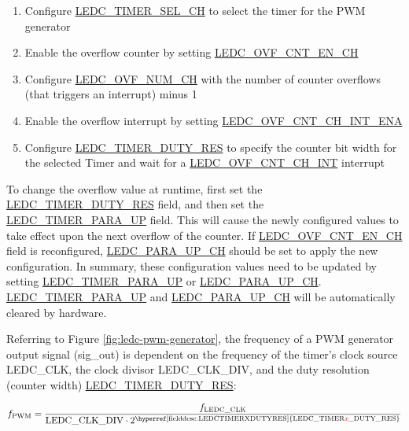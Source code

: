 \documentclass[main\_\_EN.tex]{subfiles}
\begin{document}
 \begin{enumerate}
    \item Configure \hyperref[fielddesc:LEDCTIMERSELCHN]{LEDC\_TIMER\_SEL\_CH} to select the timer for the PWM generator
    \item Enable the overflow counter by setting  \hyperref[fielddesc:LEDCOVFCNTENCHN]{LEDC\_OVF\_CNT\_EN\_CH}
    \item Configure \hyperref[fielddesc:LEDCOVFNUMCHN]{LEDC\_OVF\_NUM\_CH} with the number of counter overflows (that triggers an interrupt) minus 1
    \item Enable the overflow interrupt by setting \hyperref[fielddesc:LEDCOVFCNTCHNINTENA]{LEDC\_OVF\_CNT\_CH\_INT\_ENA}
    \item Configure \hyperref[fielddesc:LEDCTIMERXDUTYRES]{LEDC\_TIMER\_DUTY\_RES} to specify the counter bit width for the selected Timer and wait for a \hyperref[int:ledc-ovf-cnt]{LEDC\_OVF\_CNT\_CH\_INT} interrupt
\end{enumerate}

To change the overflow value at runtime, first set the \hyperref[fielddesc:LEDCTIMERXDUTYRES]{LEDC\_TIMER\_DUTY\_RES} field, and then set the\\ \hyperref[fielddesc:LEDCTIMERXPARAUP]{LEDC\_TIMER\_PARA\_UP} field. This will cause the newly configured values to take effect upon the next overflow of the counter. If \hyperref[fielddesc:LEDCOVFCNTENCHN]{LEDC\_OVF\_CNT\_EN\_CH} field is reconfigured, \hyperref[fielddesc:LEDCPARAUPCHN]{LEDC\_PARA\_UP\_CH} should be set to apply the new configuration. In summary, these configuration values need to be updated by setting \hyperref[fielddesc:LEDCTIMERXPARAUP]{LEDC\_TIMER\_PARA\_UP} or \hyperref[fielddesc:LEDCPARAUPCHN]{LEDC\_PARA\_UP\_CH}. \hyperref[fielddesc:LEDCTIMERXPARAUP]{LEDC\_TIMER\_PARA\_UP} and \hyperref[fielddesc:LEDCPARAUPCHN]{LEDC\_PARA\_UP\_CH} will be automatically cleared by hardware.

Referring to Figure \ref{fig:ledc-pwm-generator}, the frequency of a PWM generator output signal (sig\_out) is dependent on the frequency of the timer's clock source LEDC\_CLK, the clock divisor LEDC\_CLK\_DIV, and the duty resolution (counter width) \hyperref[fielddesc:LEDCTIMERXDUTYRES]{LEDC\_TIMER\_DUTY\_RES}:

    \[
    f_{\textrm{PWM}}=\frac{f_{\textrm{LEDC\_CLK}}}
                        {\textrm{LEDC\_CLK\_DIV}\cdot 2^{\textrm{\hyperref[fielddesc:LEDCTIMERXDUTYRES]{LEDC\_TIMER\regindex{x}\_DUTY\_RES}}}}
    \]
\end{document}
